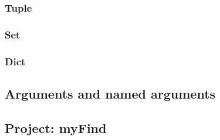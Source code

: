 \subsubsection{Tuple}
\subsubsection{Set}
\subsubsection{Dict}

\subsection{Arguments and named arguments}

\subsection{Project: myFind}
